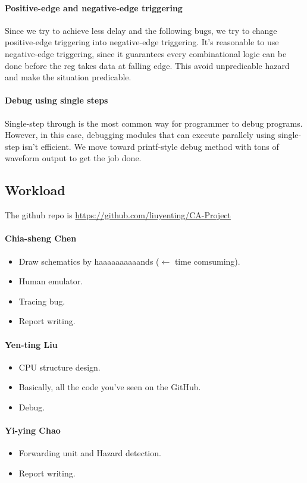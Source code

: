 \documentclass[11pt, a4paper]{article}
\begin{document}
\paragraph{Positive-edge and negative-edge triggering}
Since we try to achieve less delay and the following bugs, we try to change positive-edge triggering into negative-edge triggering. It's reasonable to use negative-edge triggering, since it guarantees every combinational logic can be done before the reg takes data at falling edge. This avoid unpredicable hazard and make the situation predicable.

\paragraph{Debug using single steps}
Single-step through is the most common way for programmer to debug programs. However, in this case, debugging modules that can execute parallely using single-step isn't efficient. We move toward printf-style debug method with tons of waveform output to get the job done.

\subsection{Workload}
The github repo is \url{https://github.com/liuyenting/CA-Project}
\paragraph{Chia-sheng Chen}
	\begin{itemize}
		\item Draw schematics by haaaaaaaaaands ($\leftarrow$ time comsuming).
		\item Human emulator.
		\item Tracing bug.
		\item Report writing.
	\end{itemize}
\paragraph{Yen-ting Liu}
	\begin{itemize}
	\item CPU structure design.
	\item Basically, all the code you've seen on the GitHub.
	\item Debug. 
	\end{itemize}
\paragraph{Yi-ying Chao}
	\begin{itemize}
	\item Forwarding unit and Hazard detection.
	\item Report writing.
	\end{itemize}
\end{document}
